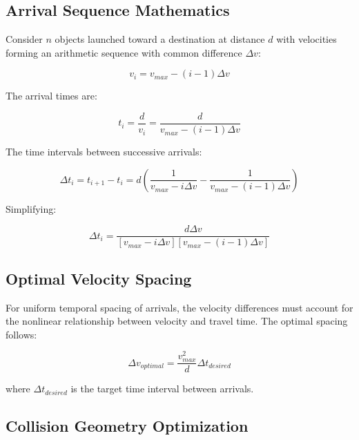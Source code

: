 \documentclass[11pt,a4paper]{article}
\theoremstyle{remark}
\begin{document}
\subsection{Arrival Sequence Mathematics}

Consider $n$ objects launched toward a destination at distance $d$ with velocities forming an arithmetic sequence with common difference $\Delta v$:

\begin{equation}
v_i = v_{max} - (i-1)\Delta v
\label{eq:launch_velocity_sequence}
\end{equation}

The arrival times are:

\begin{equation}
t_i = \frac{d}{v_i} = \frac{d}{v_{max} - (i-1)\Delta v}
\label{eq:arrival_times}
\end{equation}

The time intervals between successive arrivals:

\begin{equation}
\Delta t_i = t_{i+1} - t_i = d\left(\frac{1}{v_{max} - i\Delta v} - \frac{1}{v_{max} - (i-1)\Delta v}\right)
\label{eq:arrival_intervals}
\end{equation}

Simplifying:

\begin{equation}
\Delta t_i = \frac{d \Delta v}{[v_{max} - i\Delta v][v_{max} - (i-1)\Delta v]}
\label{eq:simplified_intervals}
\end{equation}

\subsection{Optimal Velocity Spacing}

For uniform temporal spacing of arrivals, the velocity differences must account for the nonlinear relationship between velocity and travel time. The optimal spacing follows:

\begin{equation}
\Delta v_{optimal} = \frac{v_{max}^2}{d} \Delta t_{desired}
\label{eq:optimal_spacing}
\end{equation}

where $\Delta t_{desired}$ is the target time interval between arrivals.

\subsection{Collision Geometry Optimization}
\end{document}
